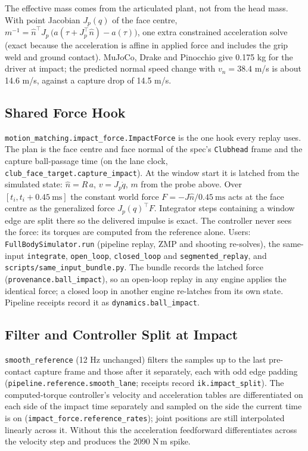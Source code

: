 \documentclass[11pt,a4paper]{article}
\begin{document}
The effective mass comes from the articulated plant, not from the head mass.
With point Jacobian $J_p(q)$ of the face centre,
$m^{-1}=\hat n^{\top}J_p\,\bigl(a(\tau+J_p^{\top}\hat n)-a(\tau)\bigr)$, one
extra constrained acceleration solve (exact because the acceleration is
affine in applied force and includes the grip weld and ground contact).
MuJoCo, Drake and Pinocchio give 0.175 kg for the driver at impact; the
predicted normal speed change with $v_n=38.4$ m/s is about 14.6 m/s, against
a capture drop of 14.5 m/s.

\subsection{Shared Force Hook}
\texttt{motion\_matching.impact\_force.ImpactForce} is the one hook every
replay uses. The plan is the face centre and face normal of the spec's
\texttt{Clubhead} frame and the capture ball-passage time (on the lane clock,
\texttt{club\_face\_target.capture\_impact}). At the window start it is
latched from the simulated state: $\hat n=R\,a$, $v=J_p\dot q$, $m$ from the
probe above. Over $[t_i,t_i+0.45\ \mathrm{ms}]$ the constant world force
$F=-J\hat n/0.45\ \mathrm{ms}$ acts at the face centre as the generalized
force $J_p(q)^{\top}F$. Integrator steps containing a window edge are split
there so the delivered impulse is exact. The controller never sees the
force: its torques are computed from the reference alone. Users:
\texttt{FullBodySimulator.run} (pipeline replay, ZMP and shooting re-solves),
the same-input \texttt{integrate}, \texttt{open\_loop}, \texttt{closed\_loop}
and \texttt{segmented\_replay}, and \texttt{scripts/same\_input\_bundle.py}.
The bundle records the latched force (\texttt{provenance.ball\_impact}), so an
open-loop replay in any engine applies the identical force; a closed loop in
another engine re-latches from its own state. Pipeline receipts record it as
\texttt{dynamics.ball\_impact}.

\subsection{Filter and Controller Split at Impact}
\texttt{smooth\_reference} (12 Hz unchanged) filters the samples up to the
last pre-contact capture frame and those after it separately, each with odd
edge padding (\texttt{pipeline.reference.smooth\_lane}; receipts record
\texttt{ik.impact\_split}). The computed-torque controller's velocity and
acceleration tables are differentiated on each side of the impact time
separately and sampled on the side the current time is on
(\texttt{impact\_force.reference\_rates}); joint positions are still
interpolated linearly across it. Without this the acceleration feedforward
differentiates across the velocity step and produces the 2090 N\,m spike.
\end{document}

